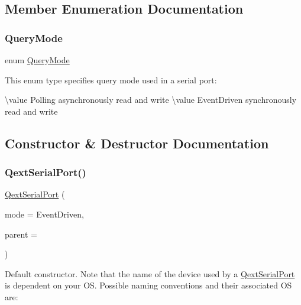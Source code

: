 \subsection{Member Enumeration Documentation}
\mbox{\label{class_qext_serial_port_a269e1f3656224a10c321bd70ab89cf64}} 
\subsubsection{\texorpdfstring{QueryMode}{QueryMode}}
{\footnotesize\ttfamily enum \mbox{\hyperlink{class_qext_serial_port_a269e1f3656224a10c321bd70ab89cf64}{Query\+Mode}}}

This enum type specifies query mode used in a serial port\+:

\textbackslash{}value Polling asynchronously read and write \textbackslash{}value Event\+Driven synchronously read and write 

\subsection{Constructor \& Destructor Documentation}
\mbox{\label{class_qext_serial_port_af9bd56447247a8f2b561592f53cf063f}} 
\subsubsection{\texorpdfstring{QextSerialPort()}{QextSerialPort()}\hspace{0.1cm}{\footnotesize\ttfamily [1/4]}}
{\footnotesize\ttfamily \mbox{\hyperlink{class_qext_serial_port}{Qext\+Serial\+Port}} (\begin{DoxyParamCaption}\item[{\mbox{\hyperlink{class_qext_serial_port_a269e1f3656224a10c321bd70ab89cf64}{Qext\+Serial\+Port\+::\+Query\+Mode}}}]{mode = {\ttfamily EventDriven},  }\item[{Q\+Object $\ast$}]{parent = {} }\end{DoxyParamCaption})\hspace{0.3cm}{\ttfamily [explicit]}}

Default constructor. Note that the name of the device used by a \mbox{\hyperlink{class_qext_serial_port}{Qext\+Serial\+Port}} is dependent on your OS. Possible naming conventions and their associated OS are\+:


